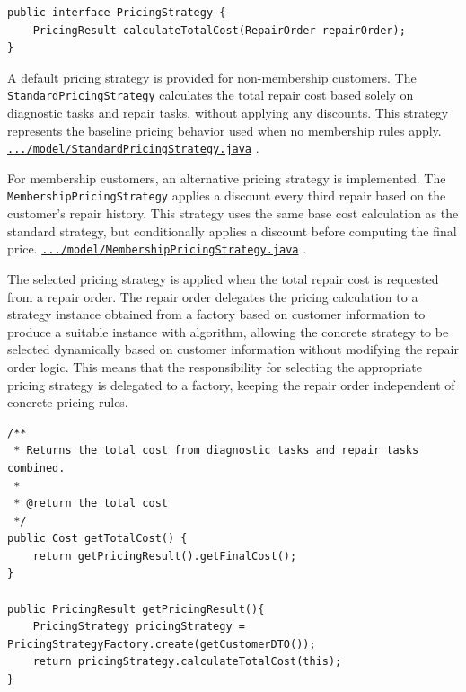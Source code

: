 \documentclass[a4paper]{scrartcl}
\begin{document}
\begin{lstlisting}[style=javastyle, caption={Pricing strategy interface}]
public interface PricingStrategy {
    PricingResult calculateTotalCost(RepairOrder repairOrder);
}
\end{lstlisting}


A default pricing strategy is provided for non-membership customers. The \texttt{StandardPricingStrategy} calculates the total repair cost based solely on diagnostic tasks and repair tasks, without applying any discounts. This strategy represents the baseline pricing behavior used when no membership rules apply. \href{https://github.com/mo-mosverkstad/java-learning/blob/183fd32417c1e32630f41e821e872cda2c43eda9/maven-projects/ElectricBikeRepair/src/main/java/se/ebikerepair/model/StandardPricingStrategy.java}{\nolinkurl{.../model/StandardPricingStrategy.java}} \cite{sourcecode}.

For membership customers, an alternative pricing strategy is implemented. The \texttt{MembershipPricingStrategy} applies a discount every third repair based on the customer's repair history. This strategy uses the same base cost calculation as the standard strategy, but conditionally applies a discount before computing the final price.
\href{https://github.com/mo-mosverkstad/java-learning/blob/183fd32417c1e32630f41e821e872cda2c43eda9/maven-projects/ElectricBikeRepair/src/main/java/se/ebikerepair/model/MembershipPricingStrategy.java}{\nolinkurl{.../model/MembershipPricingStrategy.java}} \cite{sourcecode}.

The selected pricing strategy is applied when the total repair cost is requested from a repair order. The repair order delegates the pricing calculation to a strategy instance obtained from a factory based on customer information to produce a suitable instance with algorithm, allowing the concrete strategy to be selected dynamically based on customer information without modifying the repair order logic. This means that the responsibility for selecting the appropriate pricing strategy is delegated to a factory, keeping the repair order independent of concrete pricing rules.

\begin{lstlisting}[style=javastyle, caption={Applying pricing strategy in \texttt{RepairOrder}}]
/**
 * Returns the total cost from diagnostic tasks and repair tasks combined.
 *
 * @return the total cost
 */
public Cost getTotalCost() {
    return getPricingResult().getFinalCost();
}

public PricingResult getPricingResult(){
    PricingStrategy pricingStrategy = PricingStrategyFactory.create(getCustomerDTO());
    return pricingStrategy.calculateTotalCost(this);
}
\end{lstlisting}
\end{document}
